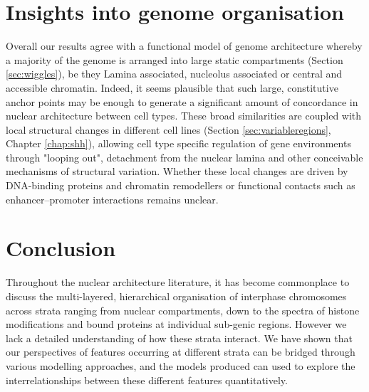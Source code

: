 \documentclass[a4paper,11pt,oneside]{book}
\begin{document}
\section{Insights into genome organisation}


Overall our results agree with a functional model of genome architecture whereby a majority of the genome is arranged into large static compartments (Section \ref{sec:wiggles}), be they Lamina associated, nucleolus associated or central and accessible chromatin. Indeed, it seems plausible that such large, constitutive anchor points may be enough to generate a significant amount of concordance in nuclear architecture between cell types.\cite{Bouwman2015a} These broad similarities are coupled with local structural changes in different cell lines (Section \ref{sec:variableregions}, Chapter \ref{chap:shh}), allowing cell type specific regulation of gene environments through "looping out", detachment from the nuclear lamina and other conceivable mechanisms of structural variation. Whether these local changes are driven by DNA-binding proteins and chromatin remodellers or functional contacts such as enhancer--promoter interactions remains unclear.

\section{Conclusion}

Throughout the nuclear architecture literature, it has become commonplace to discuss the multi-layered, hierarchical
organisation of interphase chromosomes across strata ranging from
nuclear compartments, down to the spectra of histone modifications and
bound proteins at individual sub-genic regions. However we lack a
detailed understanding of how these strata interact. We have shown
that our perspectives of features occurring at different strata can be
bridged through various modelling approaches, and the models produced can used to
explore the interrelationships between these different features quantitatively. 
\end{document}
